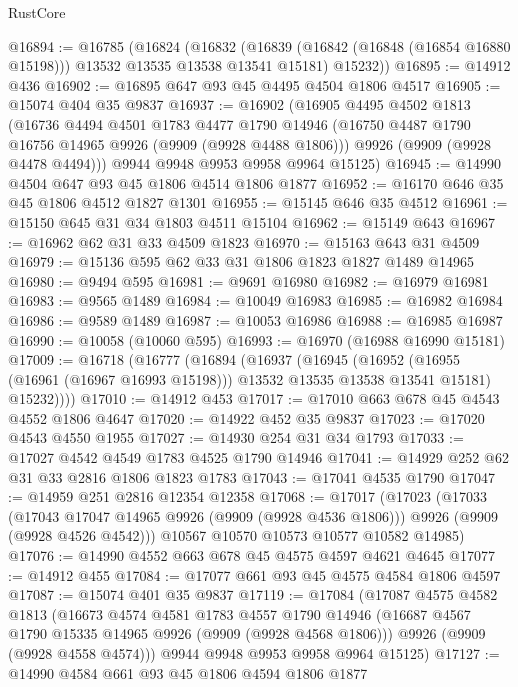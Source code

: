 \begin{lexlean}{RustCore}
\begin{coremodule}
@16894 := @16785
    (@16824
      (@16832
        (@16839 (@16842 (@16848 (@16854 @16880 @15198))) @13532 @13535 @13538 @13541 @15181)
        @15232))
@16895 := @14912 @436
@16902 := @16895 @647 @93 @45 @4495 @4504 @1806 @4517
@16905 := @15074 @404 @35 @9837
@16937 := @16902
    (@16905
      @4495
      @4502
      @1813
      (@16736
        @4494
        @4501
        @1783
        @4477
        @1790
        @14946
        (@16750 @4487 @1790 @16756 @14965 @9926 (@9909 (@9928 @4488 @1806)))
        @9926
        (@9909 (@9928 @4478 @4494)))
      @9944
      @9948
      @9953
      @9958
      @9964
      @15125)
@16945 := @14990 @4504 @647 @93 @45 @1806 @4514 @1806 @1877
@16952 := @16170 @646 @35 @45 @1806 @4512 @1827 @1301
@16955 := @15145 @646 @35 @4512
@16961 := @15150 @645 @31 @34 @1803 @4511 @15104
@16962 := @15149 @643
@16967 := @16962 @62 @31 @33 @4509 @1823
@16970 := @15163 @643 @31 @4509
@16979 := @15136 @595 @62 @33 @31 @1806 @1823 @1827 @1489 @14965
@16980 := @9494 @595
@16981 := @9691 @16980
@16982 := @16979 @16981
@16983 := @9565 @1489
@16984 := @10049 @16983
@16985 := @16982 @16984
@16986 := @9589 @1489
@16987 := @10053 @16986
@16988 := @16985 @16987
@16990 := @10058 (@10060 @595)
@16993 := @16970 (@16988 @16990 @15181)
@17009 := @16718
    (@16777
      (@16894
        (@16937
          (@16945
            (@16952 (@16955 (@16961 (@16967 @16993 @15198))) @13532 @13535 @13538 @13541 @15181)
            @15232))))
@17010 := @14912 @453
@17017 := @17010 @663 @678 @45 @4543 @4552 @1806 @4647
@17020 := @14922 @452 @35 @9837
@17023 := @17020 @4543 @4550 @1955
@17027 := @14930 @254 @31 @34 @1793
@17033 := @17027 @4542 @4549 @1783 @4525 @1790 @14946
@17041 := @14929 @252 @62 @31 @33 @2816 @1806 @1823 @1783
@17043 := @17041 @4535 @1790
@17047 := @14959 @251 @2816 @12354 @12358
@17068 := @17017
    (@17023
      (@17033
        (@17043 @17047 @14965 @9926 (@9909 (@9928 @4536 @1806)))
        @9926
        (@9909 (@9928 @4526 @4542)))
      @10567
      @10570
      @10573
      @10577
      @10582
      @14985)
@17076 := @14990 @4552 @663 @678 @45 @4575 @4597 @4621 @4645
@17077 := @14912 @455
@17084 := @17077 @661 @93 @45 @4575 @4584 @1806 @4597
@17087 := @15074 @401 @35 @9837
@17119 := @17084
    (@17087
      @4575
      @4582
      @1813
      (@16673
        @4574
        @4581
        @1783
        @4557
        @1790
        @14946
        (@16687 @4567 @1790 @15335 @14965 @9926 (@9909 (@9928 @4568 @1806)))
        @9926
        (@9909 (@9928 @4558 @4574)))
      @9944
      @9948
      @9953
      @9958
      @9964
      @15125)
@17127 := @14990 @4584 @661 @93 @45 @1806 @4594 @1806 @1877

\end{coremodule}
\end{lexlean}
